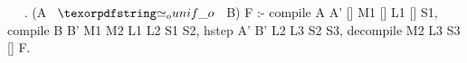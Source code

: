 \begin{elpicode}
~  ~.
(A ~$\Uo$~ B) F :-
  compile A A' [] M1 [] L1 [] S1,
  compile B B' M1 M2 L1 L2 S1 S2,
  hstep A' B' L2 L3 S2 S3,
  decompile M2 L3 S3 [] F.
\end{elpicode}
